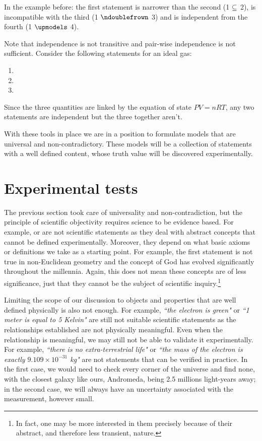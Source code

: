 \documentclass[11pt,letterpaper,fleqn]{memoir} %
\begin{document}
In the example before: the first statement is narrower than the second (1 $\subseteq$ 2), is incompatible with the third (1 $\ncomp$ 3) and is independent from the fourth (1 $\indep$ 4).

Note that independence is not transitive and pair-wise independence is not sufficient. Consider the following statements for an ideal gas:
\begin{enumerate}
	\item {}
	\item {}
	\item {}
\end{enumerate}
Since the three quantities are linked by the equation of state $PV=nRT$, any two statements are independent but the three together aren't.

With these tools in place we are in a position to formulate models that are universal and non-contradictory. These models will be a collection of statements with a well defined content, whose truth value will be discovered experimentally.

\section{Experimental tests}

The previous section took care of universality and non-contradiction, but the principle of scientific objectivity requires science to be evidence based. For example,  or  are not scientific statements as they deal with abstract concepts that cannot be defined experimentally. Moreover, they depend on what basic axioms or definitions we take as a starting point. For example, the first statement is not true in non-Euclidean geometry and the concept of God has evolved significantly throughout the millennia. Again, this does not mean these concepts are of less significance, just that they cannot be the subject of scientific inquiry.\footnote{In fact, one may be more interested in them precisely because of their abstract, and therefore less transient, nature.}

Limiting the scope of our discussion to objects and properties that are well defined physically is also not enough. For example, \emph{``the electron is green"} or \emph{``1 meter is equal to 5 Kelvin"} are still not suitable scientific statements as the relationships established are not physically meaningful. Even when the relationship is meaningful, we may still not be able to validate it experimentally. For example, \emph{``there is no extra-terrestrial life"} or \emph{``the mass of the electron is exactly $9.109 \times 10^{-31}$ kg"} are not statements that can be verified in practice. In the first case, we would need to check every corner of the universe and find none, with the closest galaxy like ours, Andromeda, being 2.5 millions light-years away; in the second case, we will always have an uncertainty associated with the measurement, however small.
\end{document}
